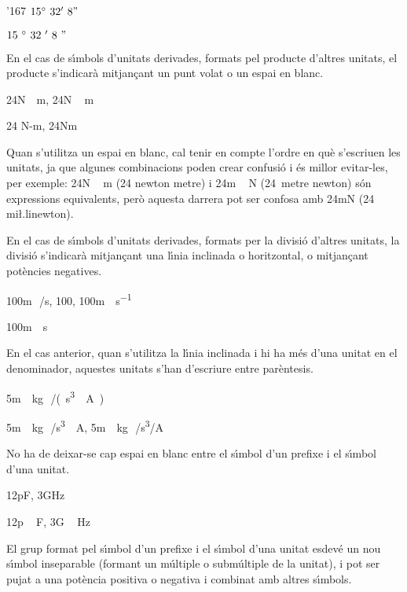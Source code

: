 \begin{dinglist}{'167}
\textcolor{Green}{} $15^\circ{}~32'~8"$

\textcolor{Red}{} $15~^\circ{}~32~'~8~"$

\item En el cas de s\'{\i}mbols d'unitats derivades, formats pel producte
d'altres unitats, el producte s'indicar\`{a} mitjan\c{c}ant un punt volat o
un espai en blanc.

\textcolor{Green}{} 24\unit{N\cdot m}, 24\unit{N\,m}

\textcolor{Red}{} 24 N-m, 24\unit{Nm}

Quan s'utilitza un espai en blanc, cal tenir en compte  l'ordre en qu\`{e} s'escriuen
les unitats, ja que algunes combinacions poden crear confusi\'{o} i
\'{e}s millor evitar-les, per exemple: 24\unit{N\,m} (24 newton metre) i
24\unit{m\,N} (24~metre newton) s\'{o}n expressions equivalents, per\`{o}
aquesta darrera pot ser confosa amb 24\unit{mN} (24 mi{\l.l}inewton).

\item En el cas de s\'{\i}mbols d'unitats derivades, formats per la divisi\'{o}
d'altres unitats, la divisi\'{o} s'indicar\`{a} mitjan\c{c}ant una l\'{\i}nia
inclinada o horitzontal, o mitjan\c{c}ant pot\`{e}ncies negatives.

\textcolor{Green}{} 100\unit{m\,/s}, 100\unit{}, 100\unit{m\cdot s^{-1}}

\textcolor{Red}{} 100\unit{m\div s}

En el cas anterior, quan s'utilitza la l\'{\i}nia inclinada i hi ha m\'{e}s
d'una unitat en el denominador, aquestes unitats s'han d'escriure
entre par\`{e}ntesis.

\textcolor{Green}{} 5\unit{m\cdot kg\,/(s^3\cdot A)}

\textcolor{Red}{} 5\unit{m\cdot kg\,/s^3\cdot A}, 5\unit{m\cdot kg\,/s^3/A}

\item No ha de deixar-se cap espai en blanc entre el s\'{\i}mbol d'un prefixe i
el s\'{\i}mbol d'una unitat.

\textcolor{Green}{} 12\unit{pF}, 3\unit{GHz}

\textcolor{Red}{} 12\unit{p\,F}, 3\unit{G\,Hz}

\item El grup format pel s\'{\i}mbol d'un prefixe i el s\'{\i}mbol d'una unitat
esdev\'{e} un nou s\'{\i}mbol inseparable (formant un m\'{u}ltiple o subm\'{u}ltiple
de la unitat), i pot ser pujat a una pot\`{e}ncia positiva o negativa i
combinat amb altres s\'{\i}mbols.


\end{dinglist}
